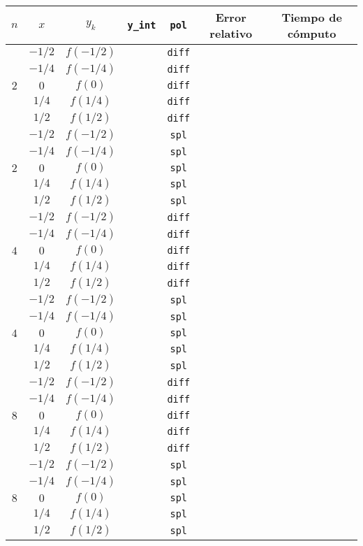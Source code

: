 \documentclass[12pt,letterpaper]{article}
\begin{document}
\begin{center}
	\begin{tabular}{|c|c|c|c|c|c|c|}
		\hline
		$n$ & $x$ & $y_k$ & \verb+y_int+ & \verb+pol+ & \textbf{Error relativo} & \textbf{Tiempo de cómputo} \\
		\hline \hline
			
		\multirow{5}{*}{$2$}
			& $-1/2$ & $f(-1/2)$ & & \verb+diff+ & & \\
			& $-1/4$ & $f(-1/4)$ & & \verb+diff+ & & \\
			& $0$ & $f(0)$ & & \verb+diff+ & & \\
			& $1/4$ & $f(1/4)$ & & \verb+diff+ & & \\
			& $1/2$ & $f(1/2)$ & & \verb+diff+ & & \\
		\hline
		\multirow{5}{*}{$2$}
			& $-1/2$ & $f(-1/2)$ & & \verb+spl+ & & \\
			& $-1/4$ & $f(-1/4)$ & & \verb+spl+ & & \\
			& $0$ & $f(0)$ & & \verb+spl+ & & \\
			& $1/4$ & $f(1/4)$ & & \verb+spl+ & & \\
			& $1/2$ & $f(1/2)$ & & \verb+spl+ & & \\
		\hline \hline
		
		\multirow{5}{*}{$4$}
			& $-1/2$ & $f(-1/2)$ & & \verb+diff+ & & \\
			& $-1/4$ & $f(-1/4)$ & & \verb+diff+ & & \\
			& $0$ & $f(0)$ & & \verb+diff+ & & \\
			& $1/4$ & $f(1/4)$ & & \verb+diff+ & & \\
			& $1/2$ & $f(1/2)$ & & \verb+diff+ & & \\
		\hline
		\multirow{5}{*}{$4$}
			& $-1/2$ & $f(-1/2)$ & & \verb+spl+ & & \\
			& $-1/4$ & $f(-1/4)$ & & \verb+spl+ & & \\
			& $0$ & $f(0)$ & & \verb+spl+ & & \\
			& $1/4$ & $f(1/4)$ & & \verb+spl+ & & \\
			& $1/2$ & $f(1/2)$ & & \verb+spl+ & & \\
		\hline \hline
		
		\multirow{5}{*}{$8$}
			& $-1/2$ & $f(-1/2)$ & & \verb+diff+ & & \\
			& $-1/4$ & $f(-1/4)$ & & \verb+diff+ & & \\
			& $0$ & $f(0)$ & & \verb+diff+ & & \\
			& $1/4$ & $f(1/4)$ & & \verb+diff+ & & \\
			& $1/2$ & $f(1/2)$ & & \verb+diff+ & & \\
		\hline
		\multirow{5}{*}{$8$}
			& $-1/2$ & $f(-1/2)$ & & \verb+spl+ & & \\
			& $-1/4$ & $f(-1/4)$ & & \verb+spl+ & & \\
			& $0$ & $f(0)$ & & \verb+spl+ & & \\
			& $1/4$ & $f(1/4)$ & & \verb+spl+ & & \\
			& $1/2$ & $f(1/2)$ & & \verb+spl+ & & \\
		\hline \hline
		

\end{tabular}
\end{center}
\end{document}
